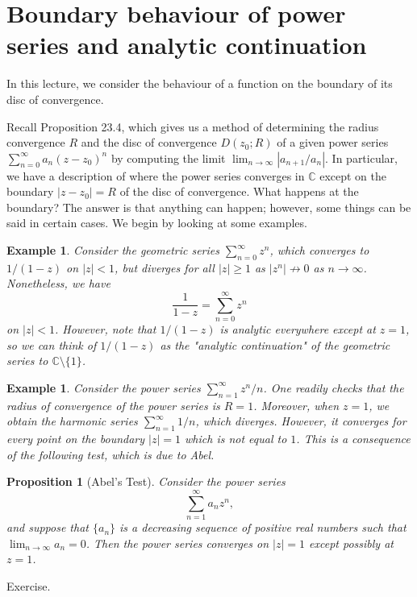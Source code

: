 \documentclass[10pt]{article}
\makeatletter
\newcommand{\C}{\mathbb{C}}
\theoremstyle{newstyle}
\newtheorem{prop}[thm]{Proposition}
\newtheorem{exmp}[thm]{Example}
\newenvironment{pf}[1][\proofname]{\par
  \pushQED{\qed}%
  \normalfont \topsep0\p@\relax
  \trivlist
  \item[\hskip\labelsep\scshape
  #1\@addpunct{.}]\ignorespaces
}{%
  \popQED\endtrivlist\@endpefalse
}
\makeatother
\begin{document}
\newpage 
\section{Boundary behaviour of power series and analytic continuation}

In this lecture, we consider the behaviour of a function on the boundary of its disc of convergence. 

Recall Proposition 23.4, which gives us a method of determining the radius convergence $R$ 
and the disc of convergence $D(z_0; R)$ of a given power series $\sum_{n=0}^\infty a_n(z-z_0)^n$
by computing the limit $\lim_{n\to\infty} |a_{n+1}/a_n|$. In particular, we have a description of where the
power series converges in $\C$ except on the boundary $|z-z_0| = R$ of the disc of convergence. 
What happens at the boundary? The answer is that anything can happen; however, some things can be 
said in certain cases. We begin by looking at some examples. 

\begin{exmp}
Consider the geometric series $\sum_{n=0}^\infty z^n$, which converges to $1/(1-z)$ on $|z| < 1$, 
but diverges for all $|z| \geq 1$ as $|z^n| \nrightarrow 0$ as $n \to \infty$. Nonetheless, we have 
\[ \frac{1}{1-z} = \sum_{n=0}^\infty z^n \]
on $|z| < 1$. However, note that $1/(1-z)$ is analytic everywhere except at $z=1$, so we can think of 
$1/(1-z)$ as the "analytic continuation" of the geometric series to $\C \setminus \{1\}$. 
\end{exmp}

\begin{exmp}
Consider the power series $\sum_{n=1}^\infty z^n/n$. One readily checks that the radius of convergence 
of the power series is $R = 1$. Moreover, when $z = 1$, we obtain the harmonic series 
$\sum_{n=1}^\infty 1/n$, which diverges. However, it converges for every point on the boundary 
$|z| = 1$ which is not equal to $1$. This is a consequence of the following test, which is due to Abel. 
\end{exmp}

\begin{prop}[Abel's Test]
Consider the power series 
\[ \sum_{n=1}^\infty a_n z^n, \]
and suppose that $\{a_n\}$ is a decreasing sequence of positive real numbers such that 
$\lim_{n\to\infty} a_n = 0$. Then the power series converges on $|z| = 1$ except possibly at $z = 1$.
\end{prop}
\begin{pf}
Exercise. 
\end{pf}
\end{document}
